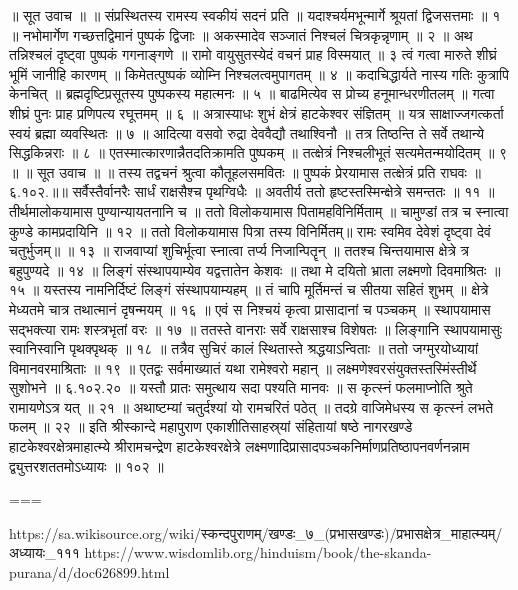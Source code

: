 ॥ सूत उवाच ॥ ॥
संप्रस्थितस्य रामस्य स्वकीयं सदनं प्रति ॥
यदाश्चर्यमभून्मार्गे श्रूयतां द्विजसत्तमाः ॥ १ ॥
नभोमार्गेण गच्छत्तद्विमानं पुष्पकं द्विजाः ॥
अकस्मादेव सञ्जातं निश्चलं चित्रकृन्नृणाम् ॥ २ ॥
अथ तन्निश्चलं दृष्ट्वा पुष्पकं गगनाङ्गणे ॥
रामो वायुसुतस्येदं वचनं प्राह विस्मयात् ॥ ३
त्वं गत्वा मारुते शीघ्रं भूमिं जानीहि कारणम् ॥
किमेतत्पुष्पकं व्योम्नि निश्चलत्वमुपागतम् ॥ ४ ॥
कदाचिद्धार्यते नास्य गतिः कुत्रापि केनचित् ॥
ब्रह्मदृष्टिप्रसूतस्य पुष्पकस्य महात्मनः ॥ ५ ॥
बाढमित्येव स प्रोच्य हनूमान्धरणीतलम् ॥
गत्वा शीघ्रं पुनः प्राह प्रणिपत्य रघूत्तमम् ॥ ६ ॥
अत्रास्याधः शुभं क्षेत्रं हाटकेश्वर संज्ञितम् ॥
यत्र साक्षाज्जगत्कर्ता स्वयं ब्रह्मा व्यवस्थितः ॥ ७ ॥
आदित्या वसवो रुद्रा देववैद्यौ तथाश्विनौ ॥
तत्र तिष्ठन्ति ते सर्वे तथान्ये सिद्धकिन्नराः ॥ ८ ॥
एतस्मात्कारणान्नैतदतिक्रामति पुष्पकम् ॥
तत्क्षेत्रं निश्चलीभूतं सत्यमेतन्मयोदितम् ॥ ९ ॥
॥ सूत उवाच ॥ ॥
तस्य तद्वचनं श्रुत्वा कौतूहलसमवितः ॥
पुष्पकं प्रेरयामास तत्क्षेत्रं प्रति राघवः ॥६.१०२.॥॥
सर्वैस्तैर्वानरैः सार्धं राक्षसैश्च पृथग्विधैः ॥
अवतीर्य ततो हृष्टस्तस्मिन्क्षेत्रे समन्ततः ॥ ११ ॥
तीर्थमालोकयामास पुण्यान्यायतनानि च ॥
ततो विलोकयामास पितामहविनिर्मिताम् ॥
चामुण्डां तत्र च स्नात्वा कुण्डे कामप्रदायिनि ॥ १२ ॥
ततो विलोकयामास पित्रा तस्य विनिर्मितम्॥
रामः स्वमिव देवेशं दृष्ट्वा देवं चतुर्भुजम्॥ ॥ १३ ॥
राजवाप्यां शुचिर्भूत्वा स्नात्वा तर्प्य निजान्पितॄन् ॥
ततश्च चिन्तयामास क्षेत्रे त्र बहुपुण्यदे ॥ १४ ॥
लिङ्गं संस्थापयाम्येव यद्वत्तातेन केशवः ॥
तथा मे दयितो भ्राता लक्ष्मणो दिवमाश्रितः ॥ १५ ॥
यस्तस्य नामनिर्दिष्टं लिङ्गं संस्थापयाम्यहम् ॥
तं चापि मूर्तिमन्तं च सीतया सहितं शुभम् ॥
क्षेत्रे मेध्यतमे चात्र तथात्मानं दृषन्मयम् ॥ १६ ॥
एवं स निश्चयं कृत्वा प्रासादानां च पञ्चकम् ॥
स्थापयामास सद्भक्त्या रामः शस्त्रभृतां वरः ॥ १७ ॥
ततस्ते वानराः सर्वे राक्षसाश्च विशेषतः ॥
लिङ्गानि स्थापयामासुः स्वानिस्वानि पृथक्पृथक् ॥ १८ ॥
तत्रैव सुचिरं कालं स्थितास्ते श्रद्धयाऽन्विताः ॥
ततो जग्मुरयोध्यायां विमानवरमाश्रिताः ॥ १९ ॥
एतद्वः सर्वमाख्यातं यथा रामेश्वरो महान् ॥
लक्ष्मणेश्वरसंयुक्तस्तस्मिंस्तीर्थे सुशोभने ॥ ६.१०२.२० ॥
यस्तौ प्रातः समुत्थाय सदा पश्यति मानवः ॥
स कृत्स्नं फलमाप्नोति श्रुते रामायणेऽत्र यत् ॥ २१ ॥
अथाष्टम्यां चतुर्दश्यां यो रामचरितं पठेत् ॥
तदग्रे वाजिमेधस्य स कृत्स्नं लभते फलम् ॥ २२ ॥
इति श्रीस्कान्दे महापुराण एकाशीतिसाहस्र्यां संहितायां षष्ठे नागरखण्डे हाटकेश्वरक्षेत्रमाहात्म्ये श्रीरामचन्द्रेण हाटकेश्वरक्षेत्रे लक्ष्मणादिप्रासादपञ्चकनिर्माणप्रतिष्ठापनवर्णनन्नाम द्व्युत्तरशततमोऽध्यायः ॥ १०२ ॥

===

https://sa.wikisource.org/wiki/स्कन्दपुराणम्/खण्डः_७_(प्रभासखण्डः)/प्रभासक्षेत्र_माहात्म्यम्/अध्यायः_१११
https://www.wisdomlib.org/hinduism/book/the-skanda-purana/d/doc626899.html

